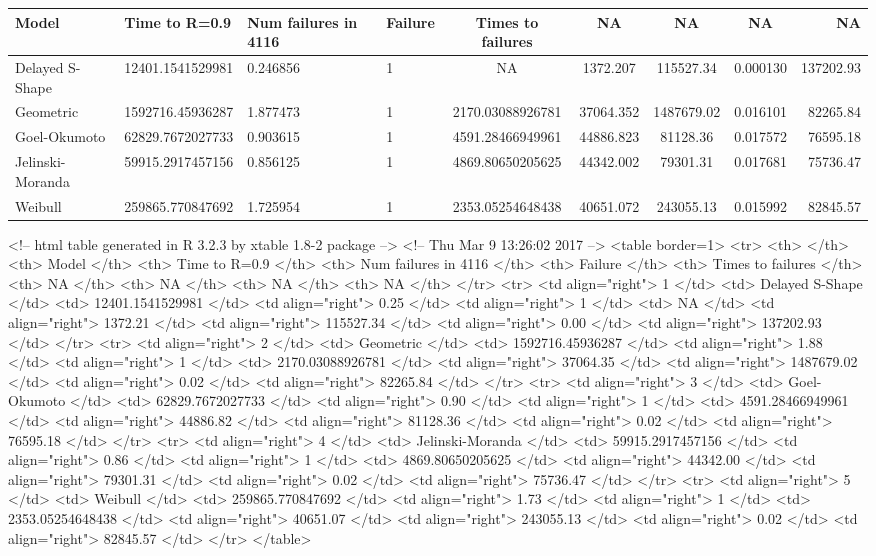 \documentclass{report}\usepackage[]{graphicx}\usepackage[]{color}
\newenvironment{knitrout}{}{} %
\begin{document}
\begin{knitrout}
\color{fgcolor}
\begin{tabular}{l|l|l|l|c|c|c|c|r}
\hline
Model & Time to R=0.9 & Num failures in 4116 & Failure & Times to failures & NA & NA & NA & NA\\
\hline
Delayed S-Shape & 12401.1541529981 & 0.246856 & 1 & NA & 1372.207 & 115527.34 & 0.000130 & 137202.93\\
\hline
Geometric & 1592716.45936287 & 1.877473 & 1 & 2170.03088926781 & 37064.352 & 1487679.02 & 0.016101 & 82265.84\\
\hline
Goel-Okumoto & 62829.7672027733 & 0.903615 & 1 & 4591.28466949961 & 44886.823 & 81128.36 & 0.017572 & 76595.18\\
\hline
Jelinski-Moranda & 59915.2917457156 & 0.856125 & 1 & 4869.80650205625 & 44342.002 & 79301.31 & 0.017681 & 75736.47\\
\hline
Weibull & 259865.770847692 & 1.725954 & 1 & 2353.05254648438 & 40651.072 & 243055.13 & 0.015992 & 82845.57\\
\hline
\end{tabular}


\end{knitrout}

<!-- html table generated in R 3.2.3 by xtable 1.8-2 package -->
<!-- Thu Mar  9 13:26:02 2017 -->
<table border=1>
<tr> <th>  </th> <th> Model </th> <th> Time to R=0.9 </th> <th> Num failures in 4116 </th> <th> Failure </th> <th> Times to failures </th> <th> NA </th> <th> NA </th> <th> NA </th> <th> NA </th>  </tr>
  <tr> <td align="right"> 1 </td> <td> Delayed S-Shape </td> <td> 12401.1541529981 </td> <td align="right"> 0.25 </td> <td align="right">   1 </td> <td> NA </td> <td align="right"> 1372.21 </td> <td align="right"> 115527.34 </td> <td align="right"> 0.00 </td> <td align="right"> 137202.93 </td> </tr>
  <tr> <td align="right"> 2 </td> <td> Geometric </td> <td> 1592716.45936287 </td> <td align="right"> 1.88 </td> <td align="right">   1 </td> <td> 2170.03088926781 </td> <td align="right"> 37064.35 </td> <td align="right"> 1487679.02 </td> <td align="right"> 0.02 </td> <td align="right"> 82265.84 </td> </tr>
  <tr> <td align="right"> 3 </td> <td> Goel-Okumoto </td> <td> 62829.7672027733 </td> <td align="right"> 0.90 </td> <td align="right">   1 </td> <td> 4591.28466949961 </td> <td align="right"> 44886.82 </td> <td align="right"> 81128.36 </td> <td align="right"> 0.02 </td> <td align="right"> 76595.18 </td> </tr>
  <tr> <td align="right"> 4 </td> <td> Jelinski-Moranda </td> <td> 59915.2917457156 </td> <td align="right"> 0.86 </td> <td align="right">   1 </td> <td> 4869.80650205625 </td> <td align="right"> 44342.00 </td> <td align="right"> 79301.31 </td> <td align="right"> 0.02 </td> <td align="right"> 75736.47 </td> </tr>
  <tr> <td align="right"> 5 </td> <td> Weibull </td> <td> 259865.770847692 </td> <td align="right"> 1.73 </td> <td align="right">   1 </td> <td> 2353.05254648438 </td> <td align="right"> 40651.07 </td> <td align="right"> 243055.13 </td> <td align="right"> 0.02 </td> <td align="right"> 82845.57 </td> </tr>
   </table>
\end{document}
